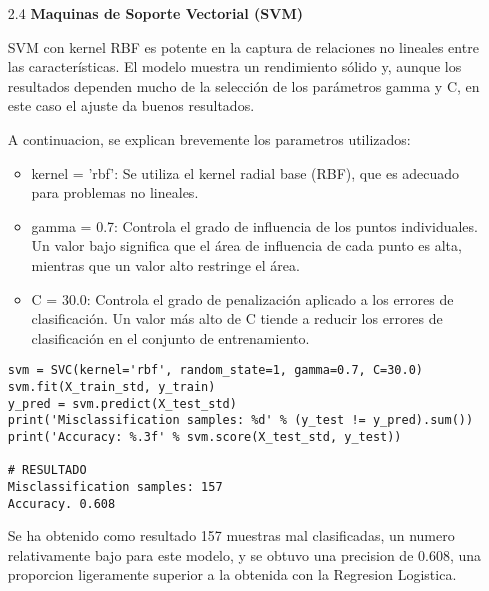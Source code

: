 \documentclass{article}
\begin{document}
\bigskip

\begin{itemize}

\item[2.4]  {\bf Maquinas de Soporte Vectorial (SVM)}

SVM con kernel RBF es potente en la captura de relaciones no lineales entre las características. El modelo muestra un rendimiento sólido y, aunque los resultados dependen mucho de la selección de los parámetros gamma y C, en este caso el ajuste da buenos resultados.

A continuacion, se explican brevemente los parametros utilizados:

\begin{itemize}

\item
kernel = 'rbf': Se utiliza el kernel radial base (RBF), que es adecuado para problemas no lineales.

\item
gamma = 0.7: Controla el grado de influencia de los puntos individuales. Un valor bajo significa que el área de influencia de cada punto es alta, mientras que un valor alto restringe el área.

\item
C = 30.0: Controla el grado de penalización aplicado a los errores de clasificación. Un valor más alto de C tiende a reducir los errores de clasificación en el conjunto de entrenamiento.

\end{itemize}

\begin{tcolorbox}[width=14cm]
\begin{scriptsize}
\begin{verbatim}
svm = SVC(kernel='rbf', random_state=1, gamma=0.7, C=30.0)
svm.fit(X_train_std, y_train)
y_pred = svm.predict(X_test_std)
print('Misclassification samples: %d' % (y_test != y_pred).sum())
print('Accuracy: %.3f' % svm.score(X_test_std, y_test))

# RESULTADO
Misclassification samples: 157
Accuracy. 0.608
\end{verbatim}
\end{scriptsize}
\end{tcolorbox}

Se ha obtenido como resultado 157 muestras mal clasificadas, un numero relativamente bajo para este modelo, y se obtuvo una precision de 0.608, una proporcion ligeramente superior a la obtenida con la Regresion Logistica.

\end{itemize}
\end{document}
